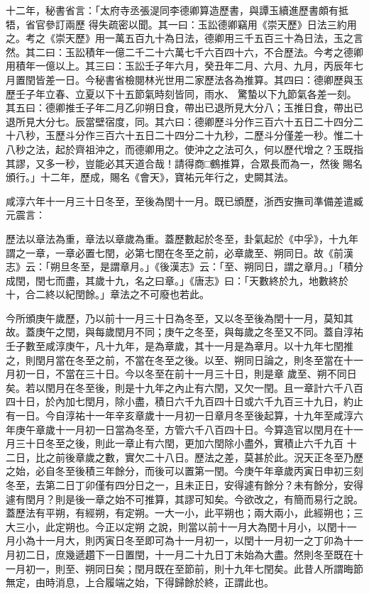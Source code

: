 \begin{pinyinscope}
 十二年，秘書省言：「太府寺丞張湜同李德卿算造歷書，與譚玉續進歷書頗有抵牾，省官參訂兩歷
 得失疏密以聞。其一曰：玉訟德卿竊用《崇天歷》日法三約用之。考之《崇天歷》用一萬五百九十為日法，德卿用三千五百三十為日法，玉之言然。其二曰：玉訟積年一億二千二十六萬七千六百四十六，不合歷法。今考之德卿用積年一億以上。其三曰：玉訟壬子年六月，癸丑年二月、六月、九月，丙辰年七月置閏皆差一日。今秘書省檢閱林光世用二家歷法各為推算。其四曰：德卿歷與玉歷壬子年立春、立夏以下十五節氣時刻皆同，雨水、
 驚蟄以下九節氣各差一刻。其五曰：德卿推壬子年二月乙卯朔日食，帶出已退所見大分八；玉推日食，帶出已退所見大分七。辰當壁宿度，同。其六曰：德卿歷斗分作三百六十五日二十四分二十八秒，玉歷斗分作三百六十五日二十四分二十九秒，二歷斗分僅差一秒。惟二十八秒之法，起於齊祖沖之，而德卿用之。使沖之之法可久，何以歷代增之？玉既指其謬，又多一秒，豈能必其天道合哉！請得商□鶴推算，合眾長而為一，然後
 賜名頒行。」十二年，歷成，賜名《會天》，寶祐元年行之，史闕其法。



 咸淳六年十一月三十日冬至，至後為閏十一月。既已頒歷，浙西安撫司準備差遣臧元震言：



 歷法以章法為重，章法以章歲為重。蓋歷數起於冬至，卦氣起於《中孚》，十九年謂之一章，一章必置七閏，必第七閏在冬至之前，必章歲至、朔同日。故《前漢志》云：「朔旦冬至，是謂章月。」《後漢志》云：「至、朔同日，謂之章月。」「積分成閏，閏七而盡，其歲十九，名之曰章。」《唐志》曰：「天數終於九，地數終於
 十，合二終以紀閏餘。」章法之不可廢也若此。



 今所頒庚午歲歷，乃以前十一月三十日為冬至，又以冬至後為閏十一月，莫知其故。蓋庚午之閏，與每歲閏月不同；庚午之冬至，與每歲之冬至又不同。蓋自淳祐壬子數至咸淳庚午，凡十九年，是為章歲，其十一月是為章月。以十九年七閏推之，則閏月當在冬至之前，不當在冬至之後。以至、朔同日論之，則冬至當在十一月初一日，不當在三十日。今以冬至在前十一月三十日，則是章
 歲至、朔不同日矣。若以閏月在冬至後，則是十九年之內止有六閏，又欠一閏。且一章計六千八百四十日，於內加七閏月，除小盡，積日六千九百四十日或六千九百三十九日，約止有一日。今自淳祐十一年辛亥章歲十一月初一日章月冬至後起算，十九年至咸淳六年庚午章歲十一月初一日當為冬至，方管六千八百四十日。今算造官以閏月在十一月三十日冬至之後，則此一章止有六閏，更加六閏除小盡外，實積止六千九百
 十二日，比之前後章歲之數，實欠二十八日。歷法之差，莫甚於此。況天正冬至乃歷之始，必自冬至後積三年餘分，而後可以置第一閏。今庚午年章歲丙寅日申初三刻冬至，去第二日丁卯僅有四分日之一，且未正日，安得遽有餘分？未有餘分，安得遽有閏月？則是後一章之始不可推算，其謬可知矣。今欲改之，有簡而易行之說。蓋歷法有平朔，有經朔，有定朔。一大一小，此平朔也；兩大兩小，此經朔也；三大三小，此定朔也。今正以定朔
 之說，則當以前十一月大為閏十月小，以閏十一月小為十一月大，則丙寅日冬至即可為十一月初一，以閏十一月初一之丁卯為十一月初二日，庶幾遞趲下一日置閏，十一月二十九日丁未始為大盡。然則冬至既在十一月初一，則至、朔同日矣；閏月既在至節前，則十九年七閏矣。此昔人所謂晦節無定，由時消息，上合履端之始，下得歸餘於終，正謂此也。




\end{pinyinscope}
